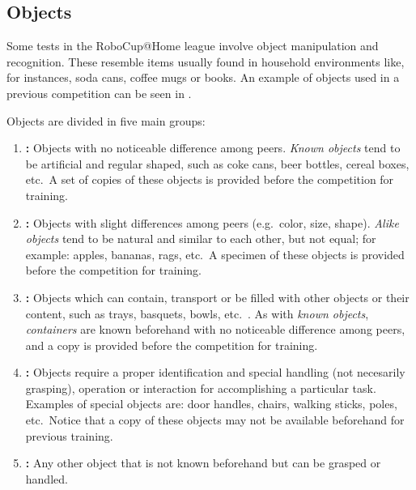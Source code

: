 %
%
%
\def\NumObjects{10\ }
\def\NumLocations{20\ }
\def\NumNames{20\ }

\subsection{Objects}
\label{rule:scenario_objects}
Some tests in the RoboCup@Home league involve object manipulation and recognition. These  resemble items usually found in household environments like, for instances, soda cans, coffee mugs or books. An example of objects used in a previous competition can be seen in .

Objects are divided in five main groups:

\begin{enumerate}
	\item \textbf{:} Objects with no noticeable difference among peers. \textit{Known objects} tend to be artificial and regular shaped, such as coke cans, beer bottles, cereal boxes, etc.~A set of copies of these objects is provided before the competition for training.

	\item \textbf{:} Objects with slight differences among peers (e.g.~color, size, shape). \textit{Alike objects} tend to be natural and similar to each other, but not equal; for example: apples, bananas, rags, etc.~A specimen of these objects is provided before the competition for training.

	\item \textbf{:} Objects which can contain, transport or be filled with other objects or their content, such as trays, basquets, bowls, etc.~. As with \textit{known objects}, \textit{containers} are known beforehand with no noticeable difference among peers, and a copy is provided before the competition for training.

	\item \textbf{:} Objects require a proper identification and special handling (not necesarily grasping), operation or interaction for accomplishing a particular task. Examples of special objects are: door handles, chairs, walking sticks, poles, etc.~Notice that a copy of these objects may not be available beforehand for previous training.

	\item \textbf{:} Any other object that is not known beforehand but can be grasped or handled.
\end{enumerate}

